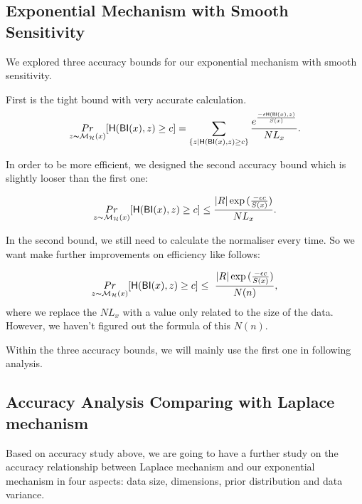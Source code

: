 \documentclass[sigconf]{acmart}
\begin{document}
\subsection{Exponential Mechanism with Smooth Sensitivity}
\label{subsec_accuracy_smoo}
We explored three accuracy bounds for our exponential mechanism with smooth sensitivity.

First is the tight bound with very accurate calculation.
\begin{equation*}
\underset{z \thicksim \mathcal{M}_{\mathcal{H}}(x)}{Pr}[ \mathsf{H}(\mathsf{BI}(x), z) \geq c] = \sum\limits_{\{z | \mathsf{H}(\mathsf{BI}(x), z) \geq c\}} \frac{e^{\frac{- \epsilon \mathsf{H}(\mathsf{BI}(x), z)}{S(x)}}}{NL_x}.
\end{equation*}

In order to be more efficient, we designed the second accuracy bound which is slightly looser than the first one:

\begin{equation*}
\underset{z \thicksim \mathcal{M}_{\mathcal{H}}(x)}{Pr}[ \mathsf{H}(\mathsf{BI}(x), z) \geq c] \leq \frac{|R| \exp{(\frac{- \epsilon c}{S(x)}})}{NL_x}.
\end{equation*}

In the second bound, we still need to calculate the normaliser every time. So we want make further improvements on efficiency like follows:

\begin{equation*}
\underset{z \thicksim \mathcal{M}_{\mathcal{H}}(x)}{Pr}[ \mathsf{H}(\mathsf{BI}(x), z) \geq c] \leq \ \frac{|R| \exp{(\frac{- \epsilon c}{S(x)}})}{N(n)},
\end{equation*}
where we replace the $NL_x$ with a value only related to the size of the data. However, we haven't figured out the formula of this $N(n)$.

Within the three accuracy bounds, we will mainly use the first one in following analysis.


\subsection{Accuracy Analysis Comparing with Laplace mechanism}
\label{subsec_accuracy_tradeoff}
Based on accuracy study above, we are going to have a further study on the accuracy relationship between Laplace mechanism and our exponential mechanism in four aspects: data size, dimensions, prior distribution and data variance.
\end{document}
